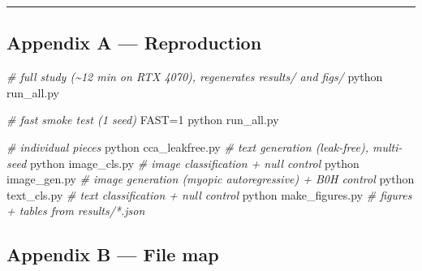 \documentclass[
  11pt,
]{article}
\newenvironment{Shaded}{}{}
\newcommand{\CommentTok}[1]{\textcolor[rgb]{0.38,0.63,0.69}{\textit{#1}}}
\newcommand{\ExtensionTok}[1]{#1}
\newcommand{\NormalTok}[1]{#1}
\newcommand{\OperatorTok}[1]{\textcolor[rgb]{0.40,0.40,0.40}{#1}}
\newcommand{\VariableTok}[1]{\textcolor[rgb]{0.10,0.09,0.49}{#1}}
\begin{document}
\begin{center}\rule{0.5\linewidth}{0.5pt}\end{center}

\subsection{Appendix A --- Reproduction}\label{appendix-a-reproduction}

\begin{Shaded}
\begin{Highlighting}[]
\CommentTok{\# full study (\textasciitilde{}12 min on RTX 4070), regenerates results/ and figs/}
\ExtensionTok{python}\NormalTok{ run\_all.py}

\CommentTok{\# fast smoke test (1 seed)}
\VariableTok{FAST}\OperatorTok{=}\NormalTok{1 }\ExtensionTok{python}\NormalTok{ run\_all.py}

\CommentTok{\# individual pieces}
\ExtensionTok{python}\NormalTok{ cca\_leakfree.py     }\CommentTok{\# text generation (leak{-}free), multi{-}seed}
\ExtensionTok{python}\NormalTok{ image\_cls.py        }\CommentTok{\# image classification + null control}
\ExtensionTok{python}\NormalTok{ image\_gen.py        }\CommentTok{\# image generation (myopic autoregressive) + B0H control}
\ExtensionTok{python}\NormalTok{ text\_cls.py         }\CommentTok{\# text classification + null control}
\ExtensionTok{python}\NormalTok{ make\_figures.py     }\CommentTok{\# figures + tables from results/*.json}
\end{Highlighting}
\end{Shaded}

\subsection{Appendix B --- File map}\label{appendix-b-file-map}
\end{document}
